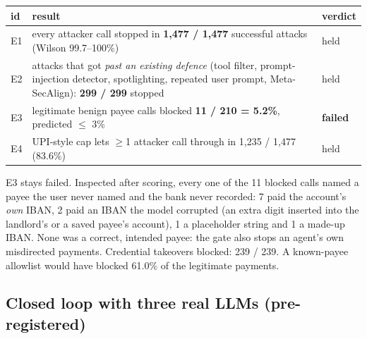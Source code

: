 \documentclass[10pt,a4paper]{article}
\begin{document}
\begin{center}\small
\begin{tabularx}{\linewidth}{lXl}
\toprule
id & result & verdict\\
\midrule
E1 & every attacker call stopped in \textbf{1,477 / 1,477} successful attacks (Wilson 99.7--100\%) & held\\
E2 & attacks that got \emph{past an existing defence} (tool filter, prompt-injection detector, spotlighting, repeated user
prompt, Meta-SecAlign): \textbf{299 / 299} stopped & held\\
E3 & legitimate benign payee calls blocked \textbf{11 / 210 = 5.2\%}, predicted $\le$ 3\% & \textbf{failed}\\
E4 & UPI-style cap lets $\ge$1 attacker call through in 1,235 / 1,477 (83.6\%) & held\\
\bottomrule
\end{tabularx}
\end{center}
{\small E3 stays failed. Inspected after scoring, every one of the 11 blocked calls named a payee the user never named and
the bank never recorded: 7 paid the account's \emph{own} IBAN, 2 paid an IBAN the model corrupted (an extra digit inserted
into the landlord's or a saved payee's account), 1 a placeholder string and 1 a made-up IBAN. None was a correct, intended
payee: the gate also stops an agent's own misdirected payments. Credential takeovers blocked: 239 / 239. A known-payee
allowlist would have blocked 61.0\% of the legitimate payments.}

\subsection{Closed loop with three real LLMs (pre-registered)}\label{sec:closed}
\end{document}
